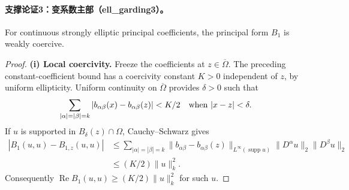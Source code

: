 \documentclass[UTF8,11pt]{ctexart}
\theoremstyle{definition}
\DeclareMathOperator{\supp}{supp}
\begin{document}
\paragraph{支撑论证3：变系数主部（ell\_garding3）。}
For continuous strongly elliptic principal coefficients, the principal
form $B_1$ is weakly coercive.
\begin{proof}
\textbf{(i) Local coercivity.}
Freeze the coefficients at $z\in\overline\Omega$. The preceding
constant-coefficient bound has a coercivity constant $K>0$ independent
of $z$, by uniform ellipticity. Uniform continuity on $\overline\Omega$
provides $\delta>0$ such that
\[
\sum_{|\alpha|=|\beta|=k}|b_{\alpha\beta}(x)-b_{\alpha\beta}(z)|<K/2
\quad\hbox{when }|x-z|<\delta.
\]
If $u$ is supported in $B_\delta(z)\cap\Omega$, Cauchy--Schwarz gives
\begin{align*}
|B_1(u,u)-B_{1,z}(u,u)|
&\leq\sum_{|\alpha|=|\beta|=k}
 \|b_{\alpha\beta}-b_{\alpha\beta}(z)\|_{L^\infty(\supp u)}
 \|D^\alpha u\|_2\|D^\beta u\|_2\\
&\leq(K/2)\|u\|_k^2.
\end{align*}
Consequently $\operatorname{Re}B_1(u,u)\geq(K/2)\|u\|_k^2$ for such $u$.


\end{proof}
\end{document}
